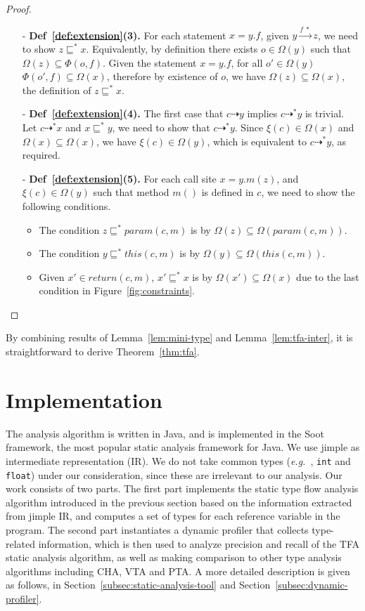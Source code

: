 \documentclass{fac}
\newcommand\eg{\textit{e.g.\ }}
\newcommand{\VPT}{\Omega}
\newcommand{\HPT}{\Phi}
\newcommand{\less}{\sqsubseteq}
\newcommand{\tflow}{\dashrightarrow}
\newcommand{\hflow}{\longrightarrow}
\newcommand{\lhflow}[1]{\stackrel{#1}{\hflow}}
\begin{document}
\begin{proof}
\begin{itemize}
\item[-] \textbf{Def~\ref{def:extension}(3).} For each statement $x = y.f$, given $y\lhflow{f\ *}z$, we need to show $z\less^* x$. Equivalently, by definition there exists $o\in\VPT(y)$ such that $\VPT(z)\subseteq\HPT(o,f)$. Given the statement $x = y.f$, for all $o'\in \VPT(y)$ $\HPT(o',f)\subseteq\VPT(x)$, therefore by existence of $o$, we have $\VPT(z)\subseteq\VPT(x)$, the definition of $z\less^* x$.
\item[-] \textbf{Def~\ref{def:extension}(4).} The first case that $c\tflow y$ implies $c\tflow^* y$ is trivial. Let $c\tflow^* x$ and $x\less^*y$, we need to show that $c\tflow^*y$. Since $\xi(c)\in\VPT(x)$ and $\VPT(x)\subseteq\VPT(x)$, we have $\xi(c)\in\VPT(y)$, which is equivalent to $c\tflow^*y$, as required.

\item[-] \textbf{Def~\ref{def:extension}(5).} For each call site $x = y.m(z)$, and $\xi(c)\in\VPT(y)$ such that method $m()$ is defined in $c$, we need to show the following conditions.
      \begin{itemize}
      \item The condition $z\less^* param(c,m)$ is by $\VPT(z)\subseteq\VPT(param(c,m))$.
      \item The condition $y\less^*this(c,m)$ is by $\VPT(y)\subseteq\VPT(this(c,m))$.
      \item Given $x'\in return(c,m)$, $x'\less^* x$ is by $\VPT(x')\subseteq\VPT(x)$ due to the last condition in Figure~\ref{fig:constraints}.
      \end{itemize}
\end{itemize}
\end{proof}
By combining results of Lemma~\ref{lem:mini-type} and Lemma~\ref{lem:tfa-inter}, it is straightforward to derive Theorem~\ref{thm:tfa}.

\section{Implementation}\label{sec:implementation}
The analysis algorithm is written in Java, and is implemented in the Soot framework, the most popular static analysis framework for Java. We use jimple as intermediate representation (IR).
We do not take common types (\eg, \texttt{int} and \texttt{float}) under our consideration, since these are irrelevant to our analysis.
Our work consists of two parts. The first part implements the static type flow analysis algorithm introduced in the previous section based on the information extracted from jimple IR, and computes a set of types for each reference variable in the program. The second part instantiates a dynamic profiler that collects type-related information, which is then used to analyze precision and recall of the TFA static analysis algorithm, as well as making comparison to other type analysis algorithms including CHA, VTA and PTA. A more detailed description is given as follows, in Section~\ref{subsec:static-analysis-tool} and Section~\ref{subsec:dynamic-profiler}.
\end{document}
